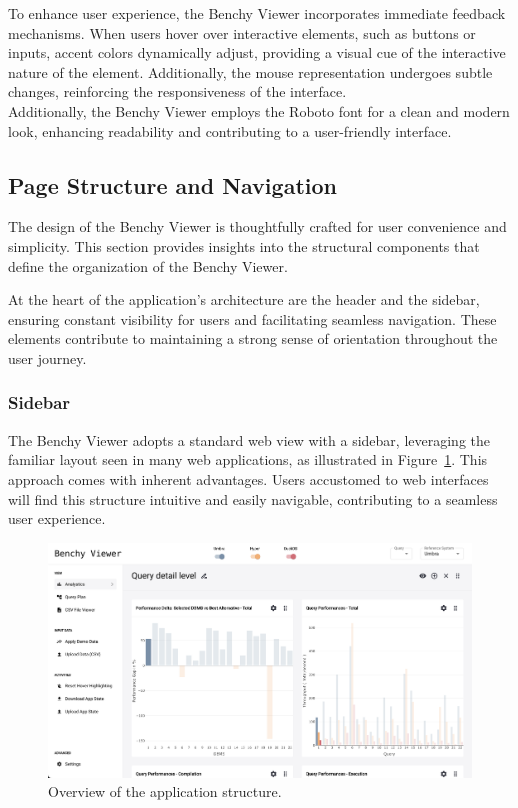 To enhance user experience, the Benchy Viewer incorporates immediate feedback mechanisms. When users hover over interactive elements, such as buttons or inputs, accent colors dynamically adjust, providing a visual cue of the interactive nature of the element. Additionally, the mouse representation undergoes subtle changes, reinforcing the responsiveness of the interface.\\
Additionally, the Benchy Viewer employs the Roboto font \parencite{roboto} for a clean and modern look, enhancing readability and contributing to a user-friendly interface.


\subsection{Page Structure and Navigation}\label{sec:page-structure}

The design of the Benchy Viewer is thoughtfully crafted for user convenience and simplicity. This section provides insights into the structural components that define the organization of the Benchy Viewer.

At the heart of the application's architecture are the header and the sidebar, ensuring constant visibility for users and facilitating seamless navigation. These elements contribute to maintaining a strong sense of orientation throughout the user journey.


\subsubsection{Sidebar}

The Benchy Viewer adopts a standard web view with a sidebar, leveraging the familiar layout seen in many web applications, as illustrated in Figure~\ref{fig:app}. This approach comes with inherent advantages. Users accustomed to web interfaces will find this structure intuitive and easily navigable, contributing to a seamless user experience.

\begin{figure}[h]
  \centering
  \includegraphics[width=1\linewidth]{figures/app.png}
  \caption{Overview of the application structure.}
  \label{fig:app}
\end{figure}

